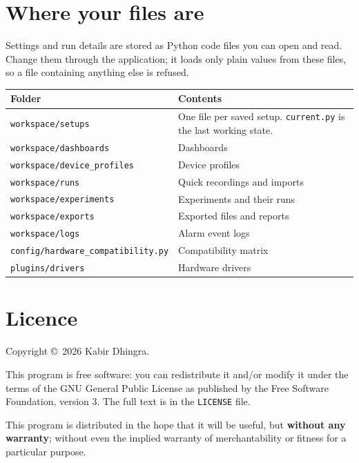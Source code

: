 \documentclass[11pt,a4paper]{article}
\newcommand{\key}[1]{\texttt{#1}}
\begin{document}
\section{Where your files are}
Settings and run details are stored as Python code files you can open and read. Change them through the application; it loads only plain values from these files, so a file containing anything else is refused.

\begin{longtable}{@{}p{50mm}p{101mm}@{}}\toprule
Folder & Contents\\\midrule\endhead
\key{workspace/setups} & One file per saved setup. \key{current.py} is the last working state.\\
\key{workspace/dashboards} & Dashboards\\
\key{workspace/device\_profiles} & Device profiles\\
\key{workspace/runs} & Quick recordings and imports\\
\key{workspace/experiments} & Experiments and their runs\\
\key{workspace/exports} & Exported files and reports\\
\key{workspace/logs} & Alarm event logs\\
\key{config/hardware\_compatibility.py} & Compatibility matrix\\
\key{plugins/drivers} & Hardware drivers\\\bottomrule
\end{longtable}
\section{Licence}
Copyright \copyright\ 2026 Kabir Dhingra.

This program is free software: you can redistribute it and/or modify it under the terms of the GNU General Public License as published by the Free Software Foundation, version 3. The full text is in the \key{LICENSE} file.

This program is distributed in the hope that it will be useful, but \textbf{without any warranty}; without even the implied warranty of merchantability or fitness for a particular purpose.
\end{document}

